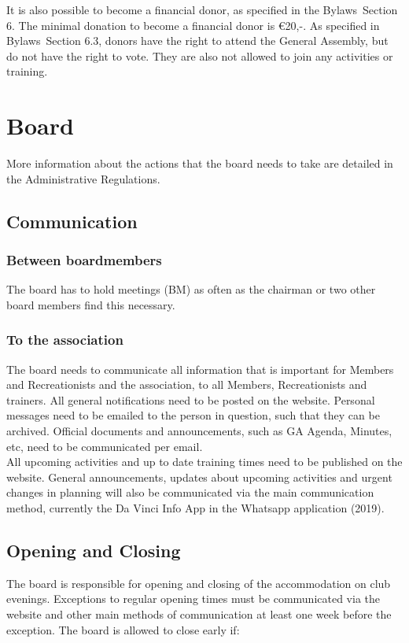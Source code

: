 \documentclass[a4paper]{article}
\newcommand{\Abr}{Administrative Regulations} %
\newcommand{\Asta}{Bylaws} %
\begin{document}
\bigskip

It is also possible to become a financial donor, as specified in the \Asta\ Section 6. The minimal donation to become a financial donor is €20,-. As specified in \Asta\ Section 6.3, donors have the right to attend the General Assembly, but do not have the right to vote. They are also not allowed to join any activities or training.

\section{Board}
More information about the actions that the board needs to take are detailed in the \Abr .
\subsection{Communication}
\subsubsection{Between boardmembers}
The board has to hold meetings (BM) as often as the chairman or two other board members find this necessary.

\subsubsection{To the association}
The board needs to communicate all information that is important for Members and Recreationists and the association, to all Members, Recreationists and trainers. All general notifications need to be posted on the website. Personal messages need to be emailed to the person in question, such that they can be archived. Official documents and announcements, such as GA Agenda, Minutes, etc, need to be communicated per email. \\
 
All upcoming activities and up to date training times need to be published on the website. 
General announcements, updates about upcoming activities and urgent changes in planning will also be communicated via the main communication method, currently the Da Vinci Info App in the Whatsapp application {\g (2019)}.

\subsection{Opening and Closing}
The board is responsible for opening and closing of the accommodation on club evenings. Exceptions to regular opening times must be communicated via the website and other main methods of communication at least one week before the exception. The board is allowed to close early if:
\end{document}
